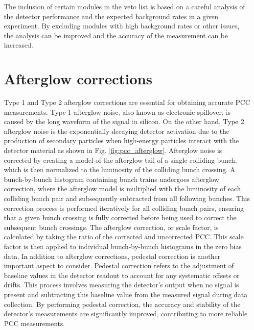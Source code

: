 The inclusion of certain modules in the veto list is based on a careful analysis of the detector performance and the expected background rates in a given experiment. By excluding modules with high background rates or other issues, the analysis can be improved and the accuracy of the measurement can be increased.


\section{Afterglow corrections}

Type 1 and Type 2 afterglow corrections are essential for obtaining accurate PCC measurements. Type 1 afterglow noise, also known as electronic spillover, is caused by the long waveform of the signal in silicon. On the other hand, Type 2 afterglow noise is the exponentially decaying detector activation due to the production of secondary particles when high-energy particles interact with the detector material as shown in Fig. \ref{fig:pcc_afterglow}. Afterglow noise is corrected by creating a model of the afterglow tail of a single colliding bunch, which is then normalized to the luminosity of the colliding bunch crossing. A bunch-by-bunch histogram containing bunch trains undergoes afterglow correction, where the afterglow model is multiplied with the luminosity of each colliding bunch pair and subsequently subtracted from all following bunches. This correction process is performed iteratively for all colliding bunch pairs, ensuring that a given bunch crossing is fully corrected before being used to correct the subsequent bunch crossings. The afterglow correction, or scale factor, is calculated by taking the ratio of the corrected and uncorrected PCC. This scale factor is then applied to individual bunch-by-bunch histograms in the zero bias data. In addition to afterglow corrections, pedestal correction is another important aspect to consider. Pedestal correction refers to the adjustment of baseline values in the detector readout to account for any systematic offsets or drifts. This process involves measuring the detector's output when no signal is present and subtracting this baseline value from the measured signal during data collection. By performing pedestal correction, the accuracy and stability of the detector's measurements are significantly improved, contributing to more reliable PCC measurements.

